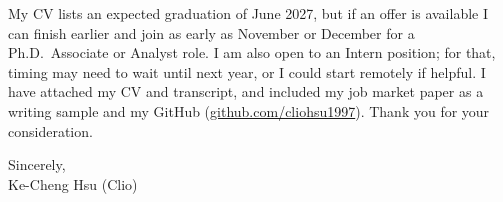 \documentclass[11pt,letterpaper]{article}
\begin{document}
My CV lists an expected graduation of June 2027, but if an offer is available I can finish earlier and join as early as November or December for a Ph.D.\ Associate or Analyst role. I am also open to an Intern position; for that, timing may need to wait until next year, or I could start remotely if helpful. I have attached my CV and transcript, and included my job market paper as a writing sample and my GitHub (\href{https://github.com/cliohsu1997}{github.com/cliohsu1997}). Thank you for your consideration.

\vspace{0.7em}
Sincerely,\\[1.0em]
Ke-Cheng Hsu (Clio)
\end{document}
